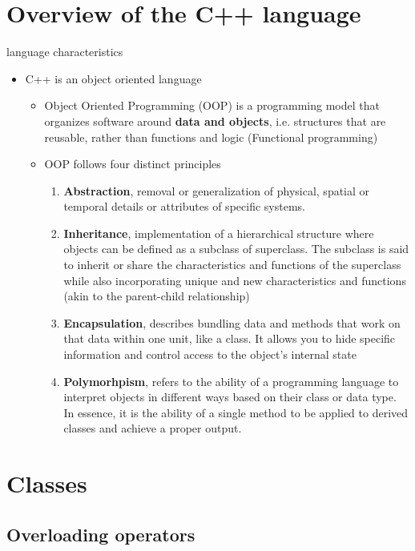 \documentclass{book}
\begin{document}
    \section{Overview of the C++ language}
    language characteristics
    \begin{itemize}
        \item C++ is an object oriented language 
        \begin{itemize}
            \item Object Oriented Programming (OOP) is a programming model that organizes software around \textbf{data and objects}, i.e. structures that are reusable, rather than functions and logic (Functional programming)
            \item OOP follows four distinct principles
            \begin{enumerate}
                \item \textbf{Abstraction}, removal or generalization of physical, spatial or temporal details or attributes of specific systems. 
                \item \textbf{Inheritance}, implementation of a hierarchical structure where objects can be defined as a subclass of superclass. The subclass is said to inherit or share the characteristics and functions of the superclass while also incorporating unique and new characteristics and functions (akin to the parent-child relationship)
                \item \textbf{Encapsulation}, describes bundling data and methods that work on that data within one unit, like a class. It allows you to hide specific information and control access to the object’s internal state
                \item \textbf{Polymorhpism}, refers to the ability of a programming language to interpret objects in different ways based on their class or data type. In essence, it is the ability of a single method to be applied to derived classes and achieve a proper output.
            \end{enumerate}
        \end{itemize}
    \end{itemize}
    \section{Classes}
    \subsection{Overloading operators}
    
\end{document}

